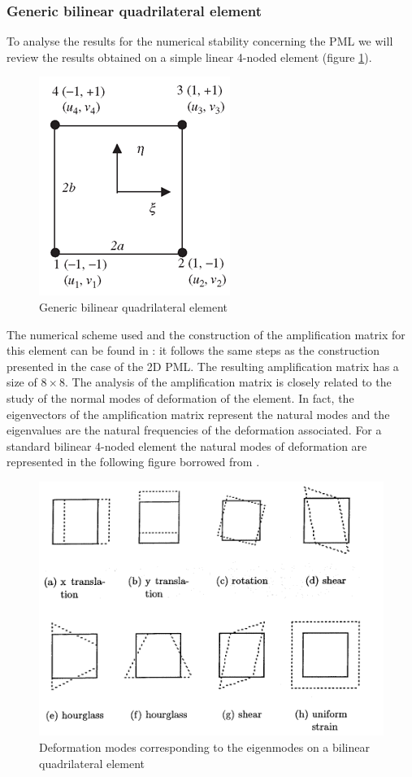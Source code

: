 \subsubsection{Generic bilinear quadrilateral element}
To analyse the results for the numerical stability concerning the PML we will review the results obtained on a simple linear 4-noded element (figure \ref{fig:4nodes}).
\begin{figure}[H]
\centering
\includegraphics[scale=0.5]{images/square2d.png}
\caption{Generic bilinear quadrilateral element}
\label{fig:4nodes}
\end{figure}
The numerical scheme used and the construction of the amplification matrix for this element can be found in \cite{Geradin}: it follows the same steps as the construction presented in the case of the 2D PML. The resulting amplification matrix has a size of $8\times 8$.
The analysis of the amplification matrix is closely related to the study of the normal modes of deformation of the element. In fact, the eigenvectors of the amplification matrix represent the natural modes and the eigenvalues are the natural frequencies of the deformation associated. For a standard bilinear 4-noded element the natural modes of deformation are represented in the following figure borrowed from \cite{Ling2002}.
\begin{figure}[H]
\centering
\includegraphics[scale=0.5]{images/def-modes.png}
\caption{Deformation modes corresponding to the eigenmodes on a bilinear quadrilateral element}
\label{fig:def-modes}
\end{figure}
